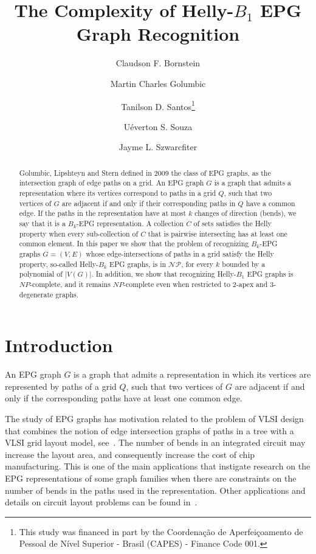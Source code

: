 \documentclass[
submission
]{dmtcs-episciences}
\author[Bornstein, Golumbic, Santos, Souza, Szwarcfiter]{Claudson F. Bornstein\affiliationmark{1} \and Martin Charles Golumbic\affiliationmark{2}\\ \and Tanilson D. Santos\affiliationmark{1,3,}\thanks{This study was financed in part by the Coordena{\c c}\~ao de Aperfei{\c c}oamento de Pessoal de N\'ivel Superior - Brasil (CAPES) - Finance Code 001.}  \and Uéverton S. Souza\affiliationmark{4} \and Jayme L. Szwarcfiter\affiliationmark{1,5}
}
\title[The Complexity of Helly-$B_{1}$ EPG Graph Recognition]{The Complexity of Helly-$B_{1}$ EPG Graph Recognition}
\affiliation{
  Federal University of Rio de Janeiro - Brazil \\
  University of Haifa - Israel\\
  Federal University of Tocantins  - Brazil \\
  Fluminense Federal University - Brazil \\
  State University of Rio de Janeiro - Brazil}
\begin{document}
\maketitle
\begin{abstract}
  Golumbic, Lipshteyn and Stern defined in 2009 the class of EPG graphs, as the  intersection graph of edge paths on a grid. An EPG graph $G$ is a graph that admits a representation where its vertices correspond to paths in a grid $Q$, such that two vertices of $G$ are adjacent if and only if their corresponding paths in $Q$ have a common edge. If the paths in the representation have at most $k$ changes of direction  (bends), we say that it is a  $B_k$-EPG representation. A collection $C$ of sets satisfies the Helly property when every sub-collection of $C$ that is pairwise intersecting has at least one common element. 
In this paper we show that the problem of recognizing $B_k$-EPG graphs $G=(V,E)$ whose edge-intersections of paths in a grid satisfy the Helly property, so-called Helly-$B_k$ EPG graphs, is in $\mathcal{NP}$, for every $k$ bounded by a polynomial of $|V(G)|$. In addition, we show that recognizing Helly-$B_1$ EPG graphs is $NP$-complete, and it remains $NP$-complete even when restricted to 2-apex and 3-degenerate graphs.
\end{abstract}


\section{Introduction}
An EPG graph $G$ is a graph that admits a representation in which its vertices are represented by paths of a grid $Q$, such that two vertices of $G$ are adjacent if and only if the corresponding paths have at least one common edge. 

The study of EPG graphs has motivation related to the problem of VLSI design that combines the notion  of  edge  intersection graphs  of  paths  in  a  tree  with  a  VLSI  grid  layout  model, see~\cite{golumbic2009}. The number of bends in an integrated circuit may increase the layout area, and consequently increase the cost of chip manufacturing.
This is one of the main applications that instigate research on the EPG representations of some graph families when there are constraints on the number of bends in the paths used in the representation.
Other applications and  details  on  circuit  layout  problems can be found in~\cite{bandy1990, molitor1991}.  %
\end{document}
